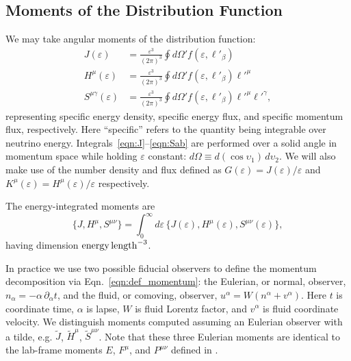 \documentclass[aps,floatfix,prd,superscriptaddress,twocolumn]{revtex4-1}
\newcommand{\todo}[1]{\marginpar{\tiny{\textcolor{red}{#1}}}}
\begin{document}
\subsection{Moments of the Distribution Function}
\label{ssec:moments}
\todo{code these up}
We may take angular moments of the distribution function:
\begin{align}
  \label{eqn:J}
  J(\varepsilon) &=
  \frac{\varepsilon^3}{(2\pi)^3} \oint d\Omega' f(\varepsilon, \ell'_\beta) \\
  \label{eqn:Ha}
  H^\mu(\varepsilon) &=
  \frac{\varepsilon^3}{(2\pi)^3} \oint d\Omega' f(\varepsilon, \ell'_\beta) \ell'^\mu \\
  \label{eqn:Sab}
  S^{\mu\gamma}(\varepsilon) &=
  \frac{\varepsilon^3}{(2\pi)^3} \oint d\Omega' f(\varepsilon, \ell'_\beta) \ell'^\mu \ell'^\gamma,
\end{align}
representing specific energy density, specific energy flux, and
specific momentum flux, respectively.
Here ``specific'' refers to the quantity being integrable over neutrino energy.
\todo{relate moments to other frames?}
Integrals~\ref{eqn:J}--\ref{eqn:Sab} are performed over a solid angle in
momentum space while holding $\varepsilon$ constant:
$d\Omega \equiv d(\cos\upsilon_1)\,d\upsilon_2$.
\todo{consistent with Eqn.~\ref{eqn:def_direction}?}
We will also make use of the number density and flux defined as
$G(\varepsilon)=J(\varepsilon)/\varepsilon$
and $K^\mu(\varepsilon)=H^\mu(\varepsilon)/\varepsilon$
respectively.

The energy-integrated moments are
\begin{equation}
  \label{eqn:J_H_S_eps_integrated}
  \big\{ J,H^\mu,S^{\mu\nu} \big\} = \int_0^\infty d\varepsilon \,
  \big\{ J(\varepsilon),H^\mu(\varepsilon),S^{\mu\nu}(\varepsilon) \big\},
\end{equation}
having dimension ${\rm energy}\,{\rm length}^{-3}$.

In practice we use two possible fiducial observers to define the momentum
decomposition via Eqn.~\ref{eqn:def_momentum}: the Eulerian,
or normal, observer, $n_\alpha=-\alpha \,\partial_\alpha t$,
and the fluid, or comoving, observer,
$u^\alpha=W(n^\alpha+v^\alpha)$.
Here $t$ is coordinate time, $\alpha$ is lapse,
$W$ is fluid Lorentz factor, and $v^\alpha$ is fluid coordinate velocity.
We distinguish moments computed assuming an Eulerian observer with a tilde,
e.g. $\tilde{J}$, $\tilde{H}^\mu$, $\tilde{S}^{\mu\nu}$.
Note that these three Eulerian moments are identical to the lab-frame moments
$E$, $F^\mu$, and $P^{\mu\nu}$
defined in
\cite{shib2011-truncated_moment, ocon2015-gr1d_with_nu, fouc2015-m1_nsbh}.
\end{document}
